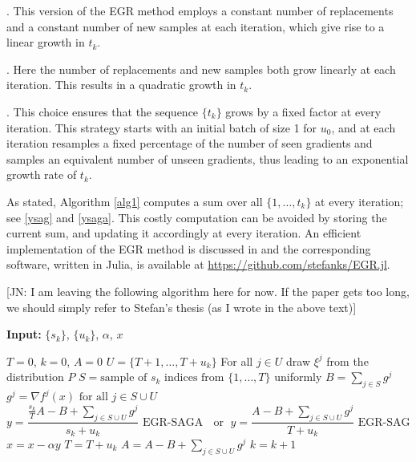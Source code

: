 \documentclass[11pt]{article}
\begin{document}
\medskip{}. This version of the EGR method employs a constant number of replacements and a constant number of new samples at each iteration, which give rise to a linear growth in $t_k$.

\medskip{}. Here the number of replacements and new samples both grow linearly at each iteration. This results in a  quadratic growth in $t_k$.

\medskip{}. This choice ensures that the sequence $\{ t_k \}$ grows by a fixed factor at every iteration. This strategy starts with an initial batch of size 1 for $u_0$, and at each iteration resamples a fixed percentage of the number of seen gradients and samples an equivalent number of unseen gradients, thus leading to an exponential growth rate of $t_k$. 
 
As stated, Algorithm \ref{alg1} computes a sum over all $\{1, \ldots ,t_k \} $ at every iteration; see \eqref{ysag} and \eqref{ysaga}. This costly computation can be avoided by storing the current sum, and updating it accordingly at every iteration. An efficient implementation of the EGR method is discussed in \cite{stefan-thesis} and the corresponding software, written in Julia, is available at \url{https://github.com/stefanks/EGR.jl}.

\bigskip
  
  {\color{blue}[JN: I am leaving the following algorithm here for now. If the paper gets too long, we should simply refer to Stefan's thesis (as I wrote in the above text)]}
  \begin{algorithm}
  	[H] 
  	\caption{EGR Algorithm (Implementation Version)}
  	\label{alg1-IMP}
  	{\bf Input:} $\{ s_k\} $, $\{ u_k \}$, $\alpha$, $x$
  	\begin{algorithmic}
  		[1] 
  		\State $T= 0$, $k = 0$, $A = 0$
  		\Loop 
  		\State $U =\{T+1,\ldots,T+u_k \}$ 
  		\State For all $j \in U$ draw $\xi^j$ from the distribution $P$ 
  		\State $S = \mbox{sample of } s_k \mbox{ indices from }\{ 1, \ldots ,T\}$ uniformly
  		\State $B = \sum_{j \in S} g^j$ 
  		\State $g^j =  \nabla f^j(x) \mbox{ for all } j \in S\cup U$ 
  		\State 
  		\begin{equation}
  			y =  \frac{\frac{s_k}{T} A - B +\sum_{j \in S\cup U}g^j}{s_k+u_k} \mbox{ EGR-SAGA } \; \mbox{ or } \; y =  \frac{A - B +\sum_{j \in S\cup U}g^j}{T+u_k} \mbox{ EGR-SAG } 
  		\end{equation}
  		\State $x  =  x - \alpha y$ 
  		\State $T =  T +u_k$ 
  		\State $A  =  A - B+ \sum_{j \in S\cup U}g^j$ 
  		\State $k = k+1$ 
  		\EndLoop 
  	\end{algorithmic}
  \end{algorithm}
  
\end{document}
